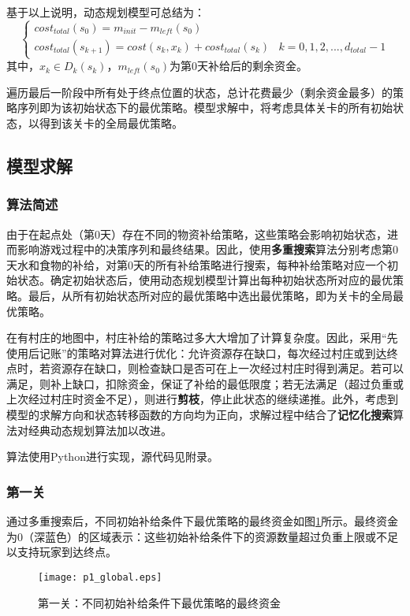 \documentclass[withoutpreface,bwprint]{cumcmthesis} %
\begin{document}
基于以上说明，动态规划模型可总结为：
\begin{equation}
    \begin{cases}
        cost_{total}(s_0)=m_{init}-m_{left}(s_0) \\
        cost_{total}(s_{k+1})=cost(s_k,x_k)+cost_{total}(s_k) & k=0,1,2,...,d_{total}-1
    \end{cases}
\end{equation}
其中，$x_k \in D_k(s_k)$，$m_{left}(s_0)$为第0天补给后的剩余资金。

遍历最后一阶段中所有处于终点位置的状态，总计花费最少（剩余资金最多）的策略序列即为该初始状态下的最优策略。模型求解中，将考虑具体关卡的所有初始状态，以得到该关卡的全局最优策略。

\subsection{模型求解}
\subsubsection{算法简述}
由于在起点处（第0天）存在不同的物资补给策略，这些策略会影响初始状态，进而影响游戏过程中的决策序列和最终结果。因此，使用\textbf{多重搜索}算法分别考虑第0天水和食物的补给，对第0天的所有补给策略进行搜索，每种补给策略对应一个初始状态。确定初始状态后，使用动态规划模型计算出每种初始状态所对应的最优策略。最后，从所有初始状态所对应的最优策略中选出最优策略，即为关卡的全局最优策略。

在有村庄的地图中，村庄补给的策略过多大大增加了计算复杂度。因此，采用“先使用后记账”的策略对算法进行优化：允许资源存在缺口，每次经过村庄或到达终点时，若资源存在缺口，则检查缺口是否可在上一次经过村庄时得到满足。若可以满足，则补上缺口，扣除资金，保证了补给的最低限度；若无法满足（超过负重或上次经过村庄时资金不足），则进行\textbf{剪枝}，停止此状态的继续递推。此外，考虑到模型的求解方向和状态转移函数的方向均为正向，求解过程中结合了\textbf{记忆化搜索}算法对经典动态规划算法加以改进。

算法使用Python进行实现，源代码见附录。
\subsubsection{第一关}
通过多重搜索后，不同初始补给条件下最优策略的最终资金如图\ref{p1_global}所示。最终资金为0（深蓝色）的区域表示：这些初始补给条件下的资源数量超过负重上限或不足以支持玩家到达终点。
\begin{figure}
    \centering
    \texttt{[image: p1\_global.eps]}
    \caption{第一关：不同初始补给条件下最优策略的最终资金}
    \label{p1_global}
\end{figure}
\end{document}
